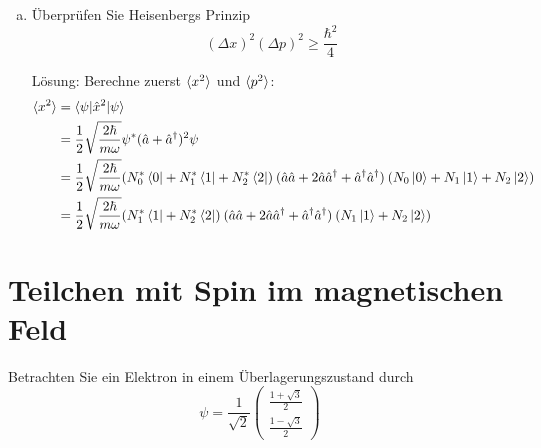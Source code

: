 \documentclass{scrartcl}
\begin{document}
\begin{enumerate}[a)]
\item Überprüfen Sie Heisenbergs Prinzip
\[(\Delta x)^2(\Delta p)^2\geq\frac{\hbar^2}{4}\]
\item[Lösung:]
Berechne zuerst $\braket{x^2}$ und $\braket{p^2}$:
\begin{align*}
\braket{x^2}	&= \braket{\psi|\hat x^2|\psi}		\\
				&= \frac 12 \sqrt{\frac{2\hbar}{m\omega}} \psi^\ast (\hat a + \hat a^\dagger)^2 \psi	\\
				&= \frac 12 \sqrt{\frac{2\hbar}{m\omega}} 
				(N_0^\ast\bra 0 + N_1^\ast \bra 1 + N_2^\ast \bra 2)
				\:(\hat a\hat a + 2 \hat a \hat a^\dagger + \hat a^\dagger\hat a^\dagger)\:
				(N_0\ket 0 + N_1 \ket 1 + N_2 \ket 2)		\\
				&= \frac 12 \sqrt{\frac{2\hbar}{m\omega}} 
				(N_1^\ast \bra 1 + N_2^\ast \bra 2)
				\:(\hat a\hat a + 2 \hat a \hat a^\dagger + \hat a^\dagger\hat a^\dagger)\:
				(N_1 \ket 1 + N_2 \ket 2)		\\
\end{align*}
\end{enumerate}

\section{Teilchen mit Spin im magnetischen Feld}
Betrachten Sie ein Elektron in einem Überlagerungszustand durch
\[\psi=\frac{1}{\sqrt 2}\begin{pmatrix}\frac{1+\sqrt 3}{2}\\\frac{1-\sqrt 3}{2}\end{pmatrix}\]
\end{document}

